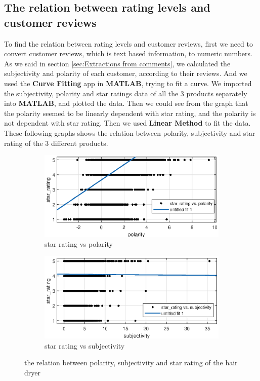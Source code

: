 \documentclass[12pt]{article}  %
\begin{document}
\subsection{The relation between rating levels and customer reviews}

To find the relation between rating levels and customer reviews, first we need to convert customer reviews, which is text based information, to numeric numbers. As we said in section \ref{sec:Extractions from comments}, we calculated the subjectivity and polarity of each customer, according to their reviews. And we used the \textbf{Curve Fitting} app in \textbf{MATLAB}, trying to fit a curve.
We imported the subjectivity, polarity and star ratings data of all the 3 products separately into \textbf{MATLAB}, and plotted the data. Then we could see from the graph that the polarity seemed to be linearly dependent with star rating, and the polarity is not dependent with star rating.
Then we used \textbf{Linear Method} to fit the data. These following graphs shows the relation between polarity, subjectivity and star rating of the 3 different products.
\begin{figure}[H]
  \centering
  \begin{subfigure}{.5\textwidth}
    \centering
    \includegraphics[width=\linewidth]{figures/hair_dryer/polarity_vs_star_rating.eps}
    \caption{star rating vs polarity}
    \label{fig:}
  \end{subfigure}%
  \begin{subfigure}{.5\textwidth}
    \centering
    \includegraphics[width=\linewidth]{figures/hair_dryer/subjectivity_vs_star_rating.eps}
    \caption{star rating vs subjectivity}
    \label{fig:}
  \end{subfigure}
  \caption{the relation between polarity, subjectivity and star rating of the hair dryer}
  \label{fig:}
\end{figure}
\end{document}
